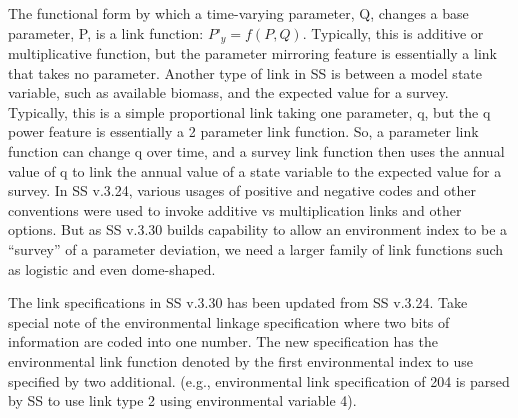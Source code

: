 The functional form by which a time-varying parameter, Q, changes a base parameter, P, is a link function:  $P’_y=f(P,Q)$. Typically, this is additive or multiplicative function, but the parameter mirroring feature is essentially a link that takes no parameter. Another type of link in SS is between a model state variable, such as available biomass, and the expected value for a survey.  Typically, this is a simple proportional link taking one parameter, q, but the q power feature is essentially a 2 parameter link function. So, a parameter link function can change q over time, and a survey link function then uses the annual value of q to link the annual value of a state variable to the expected value for a survey.  In SS v.3.24, various usages of positive and negative codes and other conventions were used to invoke additive vs multiplication links and other options. But as SS v.3.30 builds capability to allow an environment index to be a “survey” of a parameter deviation, we need a larger family of link functions such as logistic and even dome-shaped.

The link specifications in SS v.3.30 has been updated from SS v.3.24. Take special note of the environmental linkage specification where two bits of information are coded into one number. The new specification has the environmental link function denoted by the first environmental index to use specified by two additional. (e.g., environmental link specification of 204 is parsed by SS to use link type 2 using environmental variable 4).

